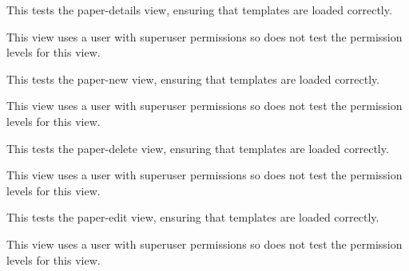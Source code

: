 \documentclass[letterpaper,10pt,english]{sphinxmanual}
\begin{document}
\begin{fulllineitems}
\begin{fulllineitems}
\end{fulllineitems}


\begin{fulllineitems}
\label{papers:papers.tests.PublicationViewTests.test_publication_view}
This tests the paper-details view, ensuring that templates are loaded correctly.

This view uses a user with superuser permissions so does not test the permission levels for this view.

\end{fulllineitems}


\begin{fulllineitems}
\label{papers:papers.tests.PublicationViewTests.test_publication_view_create}
This tests the paper-new view, ensuring that templates are loaded correctly.

This view uses a user with superuser permissions so does not test the permission levels for this view.

\end{fulllineitems}


\begin{fulllineitems}
\label{papers:papers.tests.PublicationViewTests.test_publication_view_delete}
This tests the paper-delete view, ensuring that templates are loaded correctly.

This view uses a user with superuser permissions so does not test the permission levels for this view.

\end{fulllineitems}


\begin{fulllineitems}
\label{papers:papers.tests.PublicationViewTests.test_publication_view_edit}
This tests the paper-edit view, ensuring that templates are loaded correctly.

This view uses a user with superuser permissions so does not test the permission levels for this view.

\end{fulllineitems}


\end{fulllineitems}
\end{document}
